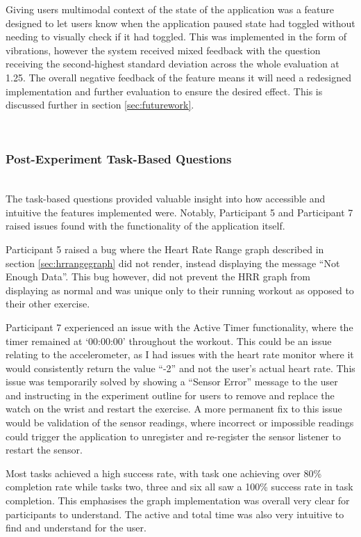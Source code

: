 \documentclass{l4proj}
\begin{document}
Giving users multimodal context of the state of the application was a feature designed to let users know when the application paused state had toggled without needing to visually check if it had toggled. This was implemented in the form of vibrations, however the system received mixed feedback with the question receiving the second-highest standard deviation across the whole evaluation at 1.25. The overall negative feedback of the feature means it will need a redesigned implementation and further evaluation to ensure the desired effect. This is discussed further in section \ref{sec:futurework}.

\noindent\mbox{}\\
\subsubsection{Post-Experiment Task-Based Questions}
\noindent\mbox{}\\

The task-based questions provided valuable insight into how accessible and intuitive the features implemented were. Notably, Participant 5 and Participant 7 raised issues found with the functionality of the application itself. 

Participant 5 raised a bug where the Heart Rate Range graph described in section \ref{sec:hrrangegraph} did not render, instead displaying the message “Not Enough Data”. This bug however, did not prevent the HRR graph from displaying as normal and was unique only to their running workout as opposed to their other exercise. 

Participant 7 experienced an issue with the Active Timer functionality, where the timer remained at ‘00:00:00’ throughout the workout. This could be an issue relating to the accelerometer, as I had issues with the heart rate monitor where it would consistently return the value “-2” and not the user’s actual heart rate. This issue was temporarily solved by showing a “Sensor Error” message to the user and instructing in the experiment outline for users to remove and replace the watch on the wrist and restart the exercise. A more permanent fix to this issue would be validation of the sensor readings, where incorrect or impossible readings could trigger the application to unregister and re-register the sensor listener to restart the sensor.

Most tasks achieved a high success rate, with task one achieving over 80\% completion rate while tasks two, three and six all saw a 100\% success rate in task completion. This emphasises the graph implementation was overall very clear for participants to understand. The active and total time was also very intuitive to find and understand for the user.
\end{document}

